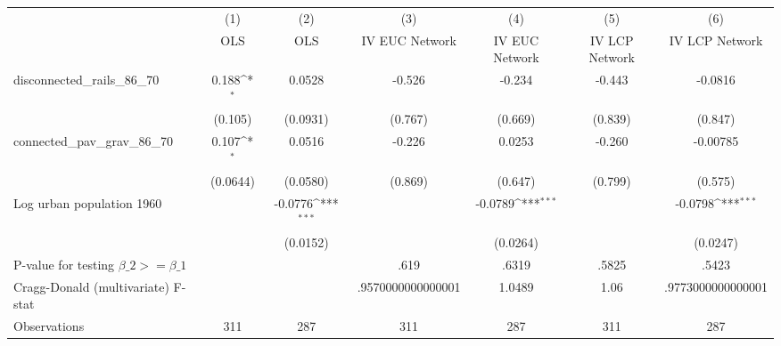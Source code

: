 {
\def\sym#1{\ifmmode^{#1}\else\(^{#1}\)\fi}
\begin{tabular}{l*{6}{c}}
\hline\hline
                &\multicolumn{1}{c}{(1)}&\multicolumn{1}{c}{(2)}&\multicolumn{1}{c}{(3)}&\multicolumn{1}{c}{(4)}&\multicolumn{1}{c}{(5)}&\multicolumn{1}{c}{(6)}\\
                &\multicolumn{1}{c}{OLS}&\multicolumn{1}{c}{OLS}&\multicolumn{1}{c}{IV EUC Network}&\multicolumn{1}{c}{IV EUC Network}&\multicolumn{1}{c}{IV LCP Network}&\multicolumn{1}{c}{IV LCP Network}\\
\hline
disconnected\_rails\_86\_70&    0.188\sym{*}  &   0.0528         &   -0.526         &   -0.234         &   -0.443         &  -0.0816         \\
                &  (0.105)         & (0.0931)         &  (0.767)         &  (0.669)         &  (0.839)         &  (0.847)         \\
[1em]
connected\_pav\_grav\_86\_70&    0.107\sym{*}  &   0.0516         &   -0.226         &   0.0253         &   -0.260         & -0.00785         \\
                & (0.0644)         & (0.0580)         &  (0.869)         &  (0.647)         &  (0.799)         &  (0.575)         \\
[1em]
Log urban population 1960&                  &  -0.0776\sym{***}&                  &  -0.0789\sym{***}&                  &  -0.0798\sym{***}\\
                &                  & (0.0152)         &                  & (0.0264)         &                  & (0.0247)         \\
\hline
P-value for testing $\beta\_{2} >= \beta\_{1}$&                  &                  &     .619         &    .6319         &    .5825         &    .5423         \\
Cragg-Donald (multivariate) F-stat&                  &                  &.9570000000000001         &   1.0489         &     1.06         &.9773000000000001         \\
Observations    &      311         &      287         &      311         &      287         &      311         &      287         \\
\hline\hline
\end{tabular}
}
